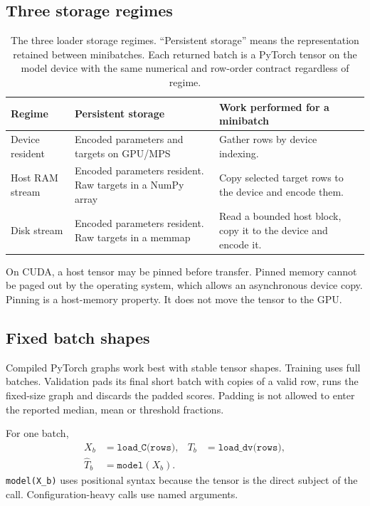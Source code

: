 \documentclass[10pt,aps,prd,twocolumn,nofootinbib]{revtex4-2}
\newcommand{\code}[1]{\texttt{#1}}
\begin{document}
\subsection{Three storage regimes}

\begin{table}[t]
\centering
\begin{tabular}{p{}p{}p{}}
\toprule
Regime & Persistent storage & Work performed for a minibatch \\
\midrule
Device resident & Encoded parameters and targets on GPU/MPS & Gather rows by
device indexing.  \\
Host RAM stream & Encoded parameters resident.  Raw targets in a NumPy array &
Copy selected target rows to the device and encode them.  \\
Disk stream & Encoded parameters resident.  Raw targets in a memmap & Read a
bounded host block, copy it to the device and encode it.  \\
\bottomrule
\end{tabular}
\caption{The three loader storage regimes.  ``Persistent storage'' means the
representation retained between minibatches.  Each returned batch is a
PyTorch tensor on the model device with the same numerical and row-order
contract regardless of regime.}
\label{tab:storage-regimes}
\end{table}

On CUDA, a host tensor may be pinned before transfer.  Pinned memory cannot be
paged out by the operating system, which allows an asynchronous device copy.
Pinning is a host-memory property.  It does not move the tensor to the GPU.

\subsection{Fixed batch shapes}

Compiled PyTorch graphs work best with stable tensor shapes.  Training uses
full batches.  Validation pads its final short batch with copies of a valid
row, runs the fixed-size graph and discards the padded scores.  Padding is not
allowed to enter the reported median, mean or threshold fractions.

For one batch,
\begin{equation*}
\begin{aligned}
  X_b&=\code{load\_C(rows)},&
  T_b&=\code{load\_dv(rows)},\\
  \widehat T_b&=\code{model}(X_b).&&
\end{aligned}
\end{equation*}
\code{model(X\_b)} uses positional syntax because the tensor is the direct
subject of the call.  Configuration-heavy calls use named arguments.
\end{document}
